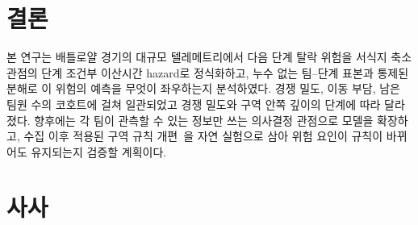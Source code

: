 \section{결론}
\label{sec:conclusion}

본 연구는 배틀로얄 경기의 대규모 텔레메트리에서 다음 단계 탈락 위험을 서식지 축소 관점의 단계 조건부 이산시간 hazard로 정식화하고, 누수 없는 팀--단계 표본과 통제된 분해로 이 위험의 예측을 무엇이 좌우하는지 분석하였다.
경쟁 밀도, 이동 부담, 남은 팀원 수의  코호트에 걸쳐 일관되었고 경쟁 밀도와 구역 안쪽 깊이의  단계에 따라 달라졌다.
향후에는 각 팀이 관측할 수 있는 정보만 쓰는 의사결정 관점으로 모델을 확장하고, 수집 이후 적용된 구역 규칙 개편~\cite{PUBGBlueZone2026}을 자연 실험으로 삼아 위험 요인이 규칙이 바뀌어도 유지되는지 검증할 계획이다.

\section*{사사}
